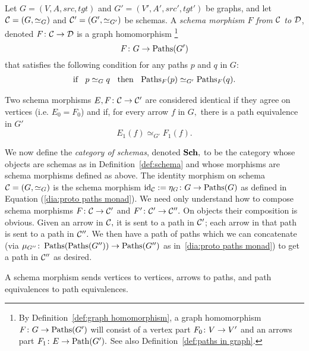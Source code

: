 \documentclass[../main/CT4S-EN-RU]{subfiles}
\begin{document}
\begin{definitionENG}\label{def:schema morphism}
Let $G=(V,A,src,tgt)$ and $G'=(V',A',src',tgt')$ be graphs, and let $\mathcal{C}=(G,\simeq_G)$ and $\mathcal{C}'=(G',\simeq_{G'})$ be schemas. A {\em schema morphism $F$ from $\mathcal{C}$ to $\mathcal{D}$}, denoted $F\colon\mathcal{C}\rightarrow\mathcal{D}$ is a graph homomorphism 
\footnote{By Definition~\ref{def:graph homomorphism}, a graph homomorphism $F\colon G\rightarrow\operatorname{Paths}(G')$ will consist of a vertex part $F_0\colon V\rightarrow V'$ and an arrows part $F_1\colon E\rightarrow\operatorname{Path}(G').$ See also Definition~\ref{def:paths in graph}.}
$$F\colon G\rightarrow\operatorname{Paths}(G')$$ that satisfies the following condition for any paths $p$ and $q$ in $G$: 
\begin{align}\label{dia:path cond for schema morphism}
\textnormal{if \;\;$p\simeq_G q$ \;\;then\;\; $\operatorname{Paths}_F(p)\simeq_{G'}\operatorname{Paths}_F(q)$}.
\end{align}

Two schema morphisms $E,F\colon\mathcal{C}\rightarrow\mathcal{C}'$ are considered identical if they agree on vertices (i.e. $E_0=F_0$) and if, for every arrow $f$ in $G,$ there is a path equivalence in $G'$ $$E_1(f)\simeq_{G'}F_1(f).$$

We now define the {\em category of schemas}, denoted ${\mathbf{Sch}},$ to be the category whose objects are schemas as in Definition~\ref{def:schema} and whose morphisms are schema morphisms defined as above. The identity morphism on schema $\mathcal{C}=(G,\simeq_G)$ is the schema morphism $\operatorname{id}_\mathcal{C}:=\eta_G\colon G\rightarrow\operatorname{Paths}(G)$ as defined in Equation (\ref{dia:proto paths monad}). We need only understand how to compose schema morphisms $F\colon\mathcal{C}\rightarrow\mathcal{C}'$ and $F'\colon\mathcal{C}'\rightarrow\mathcal{C}''.$ On objects their composition is obvious. Given an arrow in $\mathcal{C},$ it is sent to a path in $\mathcal{C}'$; each arrow in that path is sent to a path in $\mathcal{C}''.$ We then have a path of paths which we can concatenate (via $\mu_{G''}\colon\operatorname{Paths}(\operatorname{Paths}(G''))\rightarrow\operatorname{Paths}(G'')$ as in~\ref{dia:proto paths monad}) to get a path in $\mathcal{C}''$ as desired.
\end{definitionENG}

\begin{definitionRUS}\label{def:schema morphism}
\end{definitionRUS}

\begin{sloganENG}
A schema morphism sends vertices to vertices, arrows to paths, and path equivalences to path equivalences.
\end{sloganENG}
\end{document}
